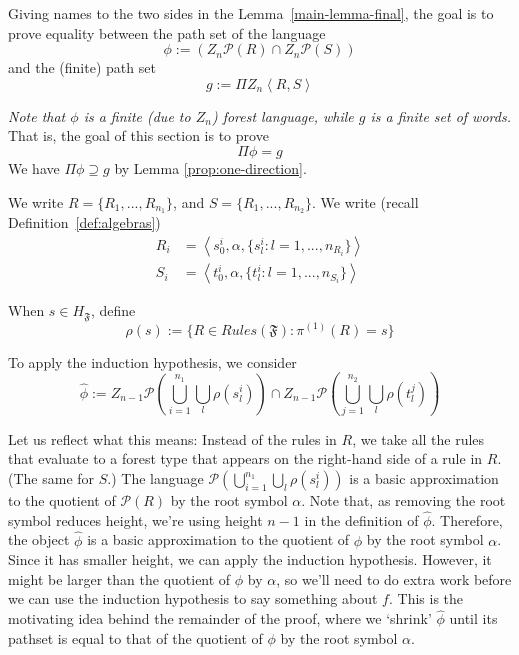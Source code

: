 \documentclass[sigplan,9pt]{acmart}\settopmatter{printfolios=true,printccs=false,printacmref=false}
\theoremstyle{definition}
\newcommand{\Ff}[0]{{\mathfrak{F}}}
\newcommand{\Pa}[0]{{\mathcal{P}}}
\newcommand{\Rn}[0]{Z_n}
\newcommand{\Rnm}[0]{Z_{n-1}}
\begin{document}
Giving names to the two sides in the Lemma~\ref{main-lemma-final}, the goal is to prove equality between the path set of the language
\begin{equation}
\phi :=  \left(\Rn\Pa\left(R\right) \cap \Rn\Pa\left(S\right)\right)
\end{equation}
and the (finite) path set
\begin{equation}\label{def:g}
g := \Pi \Rn \left\langle R, S\right\rangle 
\end{equation}

\emph{Note that $\phi$ is a finite (due to $\Rn$) forest language, while $g$ is a finite set of words.}
That is, the goal of this section is to prove
$$\Pi \phi = g$$
We have $\Pi \phi \supseteq g$ by Lemma \ref{prop:one-direction}.


We write $R = \{R_1, ..., R_{n_1}\}$, and $S = \{R_1, ..., R_{n_2}\}$.
We write (recall Definition~\ref{def:algebras})
\begin{equation}\label{eq:states-right}
\begin{split}
R_i &= \left\langle s_0^i, \alpha, \{s^i_l : l = 1, ..., n_{R_i}\} \right\rangle \\
S_i &= \left\langle t_0^i , \alpha ,\{t^i_l : l = 1, ..., n_{S_i}\}\right\rangle
\end{split}
\end{equation}

When $s \in H_\Ff$, define 
\begin{equation}\label{def:rho-state}
\rho(s) := \{ R \in Rules(\Ff) : \pi^{(1)}(R) = s\}
\end{equation}



To apply the induction hypothesis, we consider
\begin{equation}\label{def:hat-phi}
\widehat{\phi} := \Rnm\Pa\left(\bigcup_{i=1}^{n_1} \bigcup_l \rho(s^i_l)\right) \cap \Rnm\Pa\left( \bigcup_{j=1}^{n_2} \bigcup_l \rho(t^j_l)\right)
\end{equation}

Let us reflect what this means: Instead of the rules in $R$, we take all the rules that evaluate to a forest type that appears on the right-hand side of a rule in $R$. (The same for $S$.)
The language 
$\Pa\left(\bigcup_{i=1}^{n_1} \bigcup_l \rho(s^i_l)\right)$
is a basic  approximation to the quotient of $\Pa(R)$ by the root symbol $\alpha$.
Note that, as removing the root symbol reduces height, we're using height $n-1$ in the definition of $\widehat{\phi}$.
Therefore, the object $\widehat{\phi}$ is a basic  approximation to the quotient of $\phi$ by the root symbol $\alpha$. Since it has smaller height, we can apply the induction hypothesis.
However, it might be larger than the quotient of $\phi$ by $\alpha$, so we'll need to do extra work before we can use the induction hypothesis to say something about $f$. This is the motivating idea behind the remainder of the proof, where we `shrink' $\widehat{\phi}$ until its pathset is equal to that of the quotient of $\phi$ by the root symbol $\alpha$.
\end{document}
